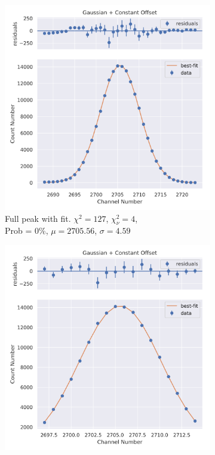 \documentclass[11pt,a4paper]{article}
\begin{document}
\begin{figure}[H]
  \centering
  \begin{subfigure}{.5\linewidth}
    \centering
    \includegraphics[width=\linewidth]{./Images/Barium133/Gauss/Gauss_7_Full.png}
    \caption{Full peak with fit. $\chi^2 = 127$, $\chi^2_\nu = 4$, \\ Prob = 0\%, $\mu = 2705.56$, $\sigma = 4.59$}
  \end{subfigure}%
  \begin{subfigure}{.5\linewidth}
    \centering
    \includegraphics[width=\linewidth]{./Images/Barium133/Gauss/Gauss_7_Zoom.png}

\end{subfigure}
\end{figure}
\end{document}
